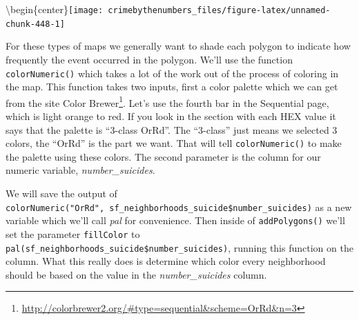 \documentclass[
]{krantz}
\makeatletter
\newenvironment{Shaded}{\begin{snugshade}}{\end{snugshade}}
\newcommand{\AttributeTok}[1]{\textcolor[rgb]{0.61,0.61,0.61}{#1}}
\newcommand{\DecValTok}[1]{\textcolor[rgb]{0.06,0.06,0.06}{#1}}
\newcommand{\FunctionTok}[1]{\textcolor[rgb]{0,0,0}{#1}}
\newcommand{\NormalTok}[1]{#1}
\newcommand{\OtherTok}[1]{\textcolor[rgb]{0.37,0.37,0.37}{#1}}
\newcommand{\SpecialCharTok}[1]{\textcolor[rgb]{0,0,0}{#1}}
\newcommand{\StringTok}[1]{\textcolor[rgb]{0.5,0.5,0.5}{#1}}
\renewcommand{\href}[2]{#2\footnote{\url{#1}}}
\newenvironment{kframe}{%
\medskip{}
\setlength{\fboxsep}{.8em}
 \def\at@end@of@kframe{}%
 \ifinner\ifhmode%
  \def\at@end@of@kframe{\end{minipage}}%
  \begin{minipage}{\columnwidth}%
 \fi\fi%
 \def\FrameCommand##1{\hskip\@totalleftmargin \hskip-\fboxsep
 \colorbox{shadecolor}{##1}\hskip-\fboxsep
     \hskip-\linewidth \hskip-\@totalleftmargin \hskip\columnwidth}%
 \MakeFramed {\advance\hsize-\width
   \@totalleftmargin\z@ \linewidth\hsize
   \@setminipage}}%
 {\par\unskip\endMakeFramed%
 \at@end@of@kframe}
\renewenvironment{Shaded}{\begin{kframe}}{\end{kframe}}
\makeatother
\begin{document}
\textbackslash begin\{center\}\texttt{[image: crimebythenumbers\_files/figure-latex/unnamed-chunk-448-1]}

For these types of maps we generally want to shade each polygon to indicate how frequently the event occurred in the polygon. We'll use the function \texttt{colorNumeric()} which takes a lot of the work out of the process of coloring in the map. This function takes two inputs, first a color palette which we can get from the site \href{http://colorbrewer2.org/\#type=sequential\&scheme=OrRd\&n=3}{Color Brewer}. Let's use the fourth bar in the Sequential page, which is light orange to red. If you look in the section with each HEX value it says that the palette is ``3-class OrRd''. The ``3-class'' just means we selected 3 colors, the ``OrRd'' is the part we want. That will tell \texttt{colorNumeric()} to make the palette using these colors. The second parameter is the column for our numeric variable, \emph{number\_suicides}.

We will save the output of \texttt{colorNumeric("OrRd",\ sf\_neighborhoods\_suicide\$number\_suicides)} as a new variable which we'll call \emph{pal} for convenience. Then inside of \texttt{addPolygons()} we'll set the parameter \texttt{fillColor} to \texttt{pal(sf\_neighborhoods\_suicide\$number\_suicides)}, running this function on the column. What this really does is determine which color every neighborhood should be based on the value in the \emph{number\_suicides} column.

\begin{Shaded}
\end{Shaded}
\end{document}

